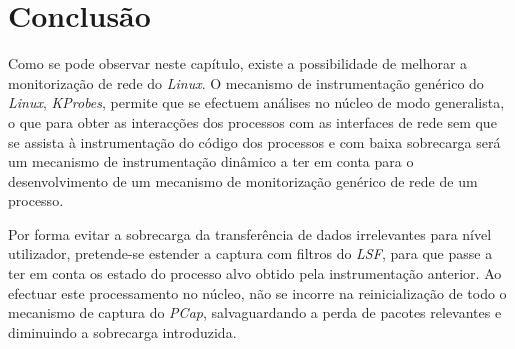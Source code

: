 
\section{Conclusão}
\label{sec:segundo:conclusion}
Como se pode observar neste capítulo, existe a possibilidade de melhorar a monitorização de rede do \textit{Linux}.
O mecanismo de instrumentação genérico do \textit{Linux}, \textit{KProbes}, permite que se efectuem análises no núcleo de modo generalista, o que para obter as interacções dos processos com as interfaces de rede sem que se assista à instrumentação do código dos processos e com baixa sobrecarga será um mecanismo de instrumentação dinâmico a ter em conta para o desenvolvimento de um mecanismo de monitorização genérico de rede de um processo.

Por forma evitar a sobrecarga da transferência de dados irrelevantes para nível utilizador, pretende-se estender a captura com filtros do \textit{LSF}, para que passe a ter em conta os estado do processo alvo obtido pela instrumentação anterior.
Ao efectuar este processamento no núcleo, não se incorre na reinicialização de todo o mecanismo de captura do \textit{PCap}, salvaguardando a perda de pacotes relevantes e diminuindo a sobrecarga introduzida.
